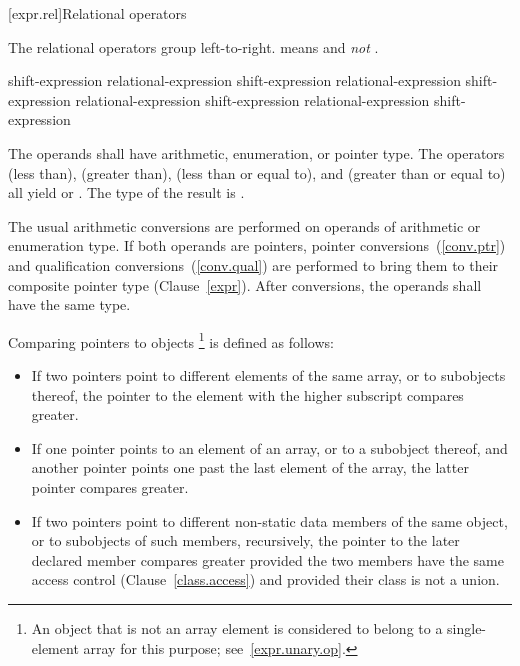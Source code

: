 [expr.rel]{Relational operators}%
%

\pnum
The relational operators group left-to-right.
\enterexample 
{} means  and \emph{not}
.
\exitexample 

%
%
%
%
%
%
%
%
%
\begin{bnf}
\br
    shift-expression\br
    relational-expression \terminal{<} shift-expression\br
    relational-expression \terminal{>} shift-expression\br
    relational-expression \terminal{<=} shift-expression\br
    relational-expression \terminal{>=} shift-expression
\end{bnf}

The operands shall have arithmetic, enumeration, or pointer type. The
operators \tcode{<} (less than), \tcode{>} (greater than), \tcode{<=}
(less than or equal to), and \tcode{>=} (greater than or equal to) all
yield  or . The type of the result is
.

\pnum
The usual arithmetic conversions are performed on operands of arithmetic
or enumeration type. If both operands are pointers, pointer
conversions~(\ref{conv.ptr}) and qualification conversions~(\ref{conv.qual})
are performed to bring
them to their composite pointer type (Clause~\ref{expr}).
After conversions, the operands shall have the same type.

\pnum
Comparing pointers to objects%
\footnote{An object that is not an array element is considered to belong to a
single-element array for this purpose; see~\ref{expr.unary.op}.}
is defined as follows:

\begin{itemize}
\item If two pointers point to different elements of the same array, or to
subobjects thereof, the pointer to the element with the higher subscript
compares greater.

\item If one pointer points to an element of an array, or to a subobject
thereof, and another pointer points one past the last element of the array, the
latter pointer compares greater.

\item If two pointers point to different non-static data members of the same
object, or to subobjects of such members, recursively,
the pointer to the later declared member compares greater provided the
two members
have the same access control (Clause~\ref{class.access})
and provided their class is not a union.

\end{itemize}

